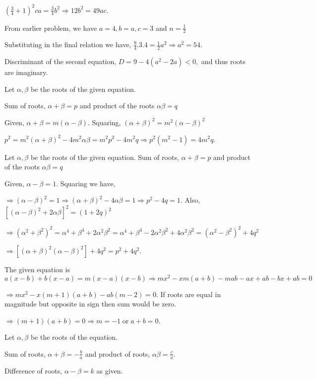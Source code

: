   $\left(\frac{3}{4} + 1\right)^2ca = \frac{3}{4}b^2 \Rightarrow 12b^2 = 49ac$.
\item From earlier problem, we have $a = 4, b = a, c = 3$ and $n = \frac{1}{2}$

  Substituting in the final relation we have, $\frac{9}{4}.3.4 = \frac{1}{2}a^2\Rightarrow a^2 = 54$.

  Discriminant of the second equation, $D = 9 - 4(a^2 - 2a) < 0,$ and thus roots are imaginary.
\item Let $\alpha, \beta$ be the roots of the given equation.

  Sum of roots, $\alpha + \beta = p$ and product of the roots $\alpha\beta = q$

  Given, $\alpha + \beta = m(\alpha - \beta)$. Squaring, $(\alpha + \beta)^2 = m^2(\alpha - \beta)^2$

  $p^2 = m^2(\alpha + \beta)^2 - 4m^2\alpha\beta = m^2p^2 - 4m^2q \Rightarrow p^2(m^2 - 1) = 4m^2q$.
\item Let $\alpha, \beta$ be the roots of the given equation. Sum of roots, $\alpha + \beta = p$ and product
  of the roots $\alpha\beta = q$

  Given, $\alpha - \beta = 1$. Squaring we have,

  $\Rightarrow (\alpha - \beta)^2 = 1 \Rightarrow (\alpha + \beta)^2 - 4\alpha\beta = 1\Rightarrow p^2 - 4q = 1$. Also,
  $[(\alpha - \beta)^2 + 2\alpha\beta]^2 = (1 + 2q)^2$

  $\Rightarrow (\alpha^2 + \beta^2)^2 = \alpha^4 + \beta^4 + 2\alpha^2\beta^2= \alpha^4 + \beta^4 - 2\alpha^2\beta^2 +
  4\alpha^2\beta^2 = (\alpha^2 - \beta^2)^2 + 4q^2$

  $\Rightarrow [(\alpha + \beta)^2(\alpha - \beta)^2] + 4q^2 = p^2 + 4q^2$.
\item The given equation is $a(x - b) + b(x - a) = m(x - a)(x - b)\Rightarrow mx^2 - xm(a + b) - mab - ax +
  ab - bx + ab = 0$

  $\Rightarrow mx^2 - x(m + 1)(a + b) - ab(m - 2) = 0$. If roots are equal in magnitude but opposite in sign
  then sum would be zero.

  $\Rightarrow (m + 1)(a + b) = 0 \Rightarrow m = -1\;\text{or}\;a + b = 0$.
\item Let $\alpha, \beta$ be the roots of the equation.

  Sum of roots, $\alpha + \beta = -\frac{b}{a}$ and product of roots, $\alpha\beta = \frac{c}{a}$.

  Difference of roots, $\alpha - \beta = k$ as given.

